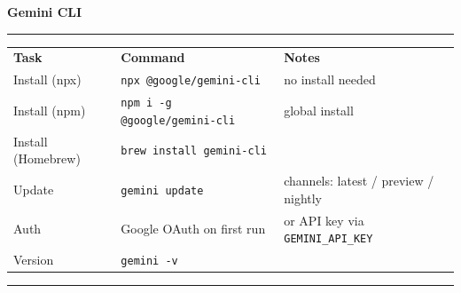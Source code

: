 \documentclass[9pt]{extarticle}
\newcommand{\cardtitle}[1]{%
  {\Large\bfseries #1}\par\vspace{1pt}%
  \rule{\linewidth}{0.4pt}\par\vspace{4pt}%
}
\begin{document}
\small

\cardtitle{Gemini CLI}

\begin{tabularx}{\linewidth}{@{}l@{\quad}l@{\quad}Y@{}}
\textbf{Task}        & \textbf{Command}                                  & \textbf{Notes} \\[2pt]
Install (npx)        & \texttt{npx @google/gemini-cli}                   & no install needed \\
Install (npm)        & \texttt{npm i -g @google/gemini-cli}              & global install \\
Install (Homebrew)   & \texttt{brew install gemini-cli}                  & \\
Update               & \texttt{gemini update}                            & channels: latest / preview / nightly \\
Auth                 & Google OAuth on first run                         & or API key via \texttt{GEMINI\_API\_KEY} \\
Version              & \texttt{gemini -v}                                & \\
\end{tabularx}

\vspace{6pt}
\rule{\linewidth}{0.2pt}
\end{document}
